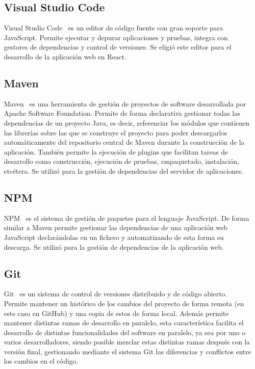 \documentclass[a4paper, 12pt]{book}
\begin{document}
    \subsection{Visual Studio Code}
    \label{subsec:intro_tools_vsc}
    Visual Studio Code~\cite{bib:vsc} es un editor de código fuente con gran soporte para JavaScript. Permite ejecutar y depurar aplicaciones y pruebas, integra con gestores de dependencias y control de versiones. Se eligió este editor para el desarrollo de la aplicación web en React.

    \subsection{Maven}
    \label{subsec:intro_tools_maven}
    Maven~\cite{bib:maven} es una herramienta de gestión de proyectos de software desarrollada por Apache Software Foundation. Permite de forma declarativa gestionar todas las dependencias de un proyecto Java, es decir, referenciar los módulos que contienen las librerías sobre las que se construye el proyecto para poder descargarlos automáticamente del repositorio central de Maven
    durante la construcción de la aplicación. También permite la ejecución de plugins que facilitan tareas de desarrollo como construcción, ejecución de pruebas, empaquetado, instalación, etcétera. Se utilizó para la gestión de dependencias del servidor de aplicaciones.

    \subsection{NPM}
    \label{subsec:intro_tools_npm}
    NPM~\cite{bib:npm} es el sistema de gestión de paquetes para el lenguaje JavaScript. De forma similar a Maven permite gestionar las dependencias de una aplicación web JavaScript declarándolas en un fichero y automatizando de esta forma su descarga. Se utilizó para la gestión de dependencias de la aplicación web.

    \subsection{Git}
    \label{subsec:intro_tools_git}
    Git~\cite{bib:git} es un sistema de control de versiones distribuido y de código abierto. Permite mantener un histórico de los cambios del proyecto de forma remota (en este caso en GitHub) y una copia de estos de forma local. Además permite mantener distintas ramas de desarrollo en paralelo, esta característica facilita el desarrollo de distintas funcionalidades del software en paralelo, ya sea por uno o varios desarrolladores, siendo posible mezclar estas distintas ramas después con la versión final, gestionando mediante el sistema Git las diferencias y conflictos entre los cambios en el código.
\end{document}
